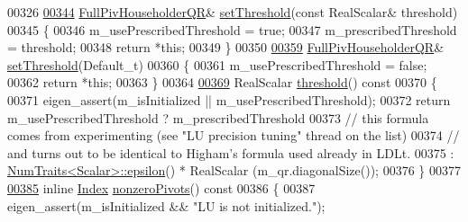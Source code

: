 \begin{DoxyCode}
00326 
\hyperlink{group___q_r___module_a92277e572bf98245891015d12dd2b602}{00344}     \hyperlink{group___q_r___module_class_eigen_1_1_full_piv_householder_q_r}{FullPivHouseholderQR}& \hyperlink{group___q_r___module_a92277e572bf98245891015d12dd2b602}{setThreshold}(\textcolor{keyword}{const} RealScalar& threshold)
00345     \{
00346       m\_usePrescribedThreshold = \textcolor{keyword}{true};
00347       m\_prescribedThreshold = threshold;
00348       \textcolor{keywordflow}{return} *\textcolor{keyword}{this};
00349     \}
00350 
\hyperlink{group___q_r___module_aaea4bf3dd145e0cddb16e364cca9d887}{00359}     \hyperlink{group___q_r___module_class_eigen_1_1_full_piv_householder_q_r}{FullPivHouseholderQR}& \hyperlink{group___q_r___module_aaea4bf3dd145e0cddb16e364cca9d887}{setThreshold}(Default\_t)
00360     \{
00361       m\_usePrescribedThreshold = \textcolor{keyword}{false};
00362       \textcolor{keywordflow}{return} *\textcolor{keyword}{this};
00363     \}
00364 
\hyperlink{group___q_r___module_af7f6ac15ca19c2b9e45dc3eaae58c201}{00369}     RealScalar \hyperlink{group___q_r___module_af7f6ac15ca19c2b9e45dc3eaae58c201}{threshold}()\textcolor{keyword}{ const}
00370 \textcolor{keyword}{    }\{
00371       eigen\_assert(m\_isInitialized || m\_usePrescribedThreshold);
00372       \textcolor{keywordflow}{return} m\_usePrescribedThreshold ? m\_prescribedThreshold
00373       \textcolor{comment}{// this formula comes from experimenting (see "LU precision tuning" thread on the list)}
00374       \textcolor{comment}{// and turns out to be identical to Higham's formula used already in LDLt.}
00375                                       : \hyperlink{group___core___module_struct_eigen_1_1_num_traits}{NumTraits<Scalar>::epsilon}() * RealScalar
      (m\_qr.diagonalSize());
00376     \}
00377 
\hyperlink{group___q_r___module_af1e4d04824084a964c1a6e51db68376f}{00385}     \textcolor{keyword}{inline} \hyperlink{namespace_eigen_a62e77e0933482dafde8fe197d9a2cfde}{Index} \hyperlink{group___q_r___module_af1e4d04824084a964c1a6e51db68376f}{nonzeroPivots}()\textcolor{keyword}{ const}
00386 \textcolor{keyword}{    }\{
00387       eigen\_assert(m\_isInitialized && \textcolor{stringliteral}{"LU is not initialized."});

\end{DoxyCode}
